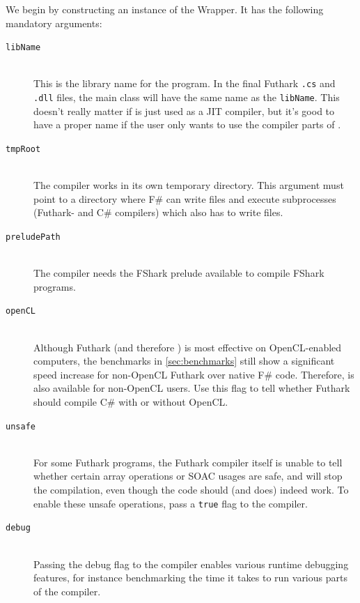 We begin by constructing an instance of the \fshark{}Wrapper. It has the following
mandatory arguments:

\begin{description}
\item[\texttt{libName}]\hfill\\
  This is the library name for the \fshark{} program. In the final Futhark
  \texttt{.cs} and \texttt{.dll} files, the main class will have the same name
  as the \texttt{libName}. This doesn't really matter if \fshark{} is just used
  as a JIT compiler, but it's good to have a proper name if the user only wants
  to use the compiler parts of \fshark{}.

\item[\texttt{tmpRoot}]\hfill\\
  The \fshark{} compiler works in its own temporary directory. This argument must
  point to a directory where F\# can write files and execute subprocesses
  (Futhark- and C\# compilers) which also has to write files.
  
\item[\texttt{preludePath}]\hfill\\
  The \fshark{} compiler needs the FShark prelude available to compile FShark
  programs. 

\item[\texttt{openCL}]\hfill\\
  Although Futhark (and therefore \fshark{}) is most effective on OpenCL-enabled
  computers, the benchmarks in \ref{sec:benchmarks} still show a significant
  speed increase for non-OpenCL Futhark over native F\# code.
  Therefore, \fshark{} is also available for non-OpenCL users. Use this flag to
  tell \fshark{} whether Futhark should compile C\# with or without OpenCL.
  
\item[\texttt{unsafe}]\hfill\\
  For some Futhark programs, the Futhark compiler itself is unable to tell
  whether certain array operations or SOAC usages are safe, and will stop the
  compilation, even though the code should (and does) indeed work.
  To enable these unsafe operations, pass a \texttt{true} flag to the compiler.

\item[\texttt{debug}]\hfill\\
  Passing the debug flag to the \fshark{} compiler enables various runtime
  debugging features, for instance benchmarking the time it takes to run various
  parts of the compiler.
\end{description}


